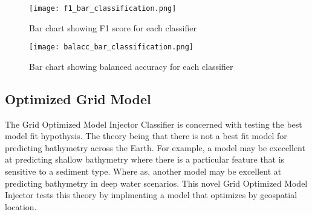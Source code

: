 
\begin{figure}[h]
    \centering
    \texttt{[image: f1\_bar\_classification.png]}
    \caption{Bar chart showing F1 score for each classifier}
    \label{fig:f1_barplot_classification}
\end{figure}

\begin{figure}[h]
    \centering
    \texttt{[image: balacc\_bar\_classification.png]}
    \caption{Bar chart showing balanced accuracy for each classifier}
    \label{fig:balacc_barplot_classification}
\end{figure}

\subsection{Optimized Grid Model}
\setlength{\parindent}{10ex}

The Grid Optimized Model Injector Classifier is concerned with testing the best model fit hypothysis.
The theory being that there is not a best fit model for predicting bathymetry across the Earth.
For example, a model may be execellent at predicting shallow bathymetry where there is a particular feature that is sensitive to a sediment type.
Where as, another model may be excellent at predicting bathymetry in deep water scenarios.
This novel Grid Optimized Model Injector tests this theory by implmenting a model that optimizes by geospatial location.

